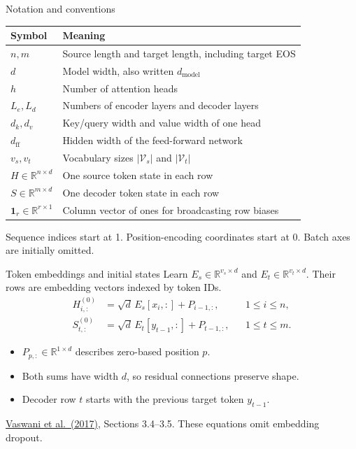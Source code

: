 \documentclass[aspectratio=169,11pt]{beamer}
\newcommand{\R}{\mathbb{R}}
\newcommand{\one}{\mathbf{1}}
\newcommand{\src}[1]{\par\vfill{\fontsize{7}{8.5}\selectfont\color{muted}#1}\par}
\newcommand{\paper}{\href{https://arxiv.org/abs/1706.03762}{Vaswani et al.\ (2017)}}
\begin{document}
\begin{frame}[t]{Notation and conventions}
\small
\begin{tabularx}{\textwidth}{@{}lX@{}}
\toprule
Symbol & Meaning \\
\midrule
$n,m$ & Source length and target length, including target EOS \\
$d$ & Model width, also written $d_{\mathrm{model}}$ \\
$h$ & Number of attention heads \\
$L_e,L_d$ & Numbers of encoder layers and decoder layers \\
$d_k,d_v$ & Key/query width and value width of one head \\
$d_{\mathrm{ff}}$ & Hidden width of the feed-forward network \\
$v_s,v_t$ & Vocabulary sizes $|\mathcal V_s|$ and $|\mathcal V_t|$ \\
$H\in\R^{n\times d}$ & One source token state in each row \\
$S\in\R^{m\times d}$ & One decoder token state in each row \\
$\one_r\in\R^{r\times1}$ & Column vector of ones for broadcasting row biases \\
\bottomrule
\end{tabularx}
\src{Sequence indices start at 1. Position-encoding coordinates start at 0. Batch axes are initially omitted.}
\end{frame}

\begin{frame}[t]{Token embeddings and initial states}
Learn $E_s\in\R^{v_s\times d}$ and $E_t\in\R^{v_t\times d}$.
Their rows are embedding vectors indexed by token IDs.
\[
\begin{aligned}
 H^{(0)}_{i,:}&=\sqrt d\,E_s[x_i,:]+P_{i-1,:}, &&1\leq i\leq n,\\
 S^{(0)}_{t,:}&=\sqrt d\,E_t[y_{t-1},:]+P_{t-1,:}, &&1\leq t\leq m.
\end{aligned}
\]
\begin{itemize}
  \item $P_{p,:}\in\R^{1\times d}$ describes zero-based position $p$.
  \item Both sums have width $d$, so residual connections preserve shape.
  \item Decoder row $t$ starts with the previous target token $y_{t-1}$.
\end{itemize}
\src{\paper, Sections 3.4--3.5. These equations omit embedding dropout.}
\end{frame}
\end{document}
